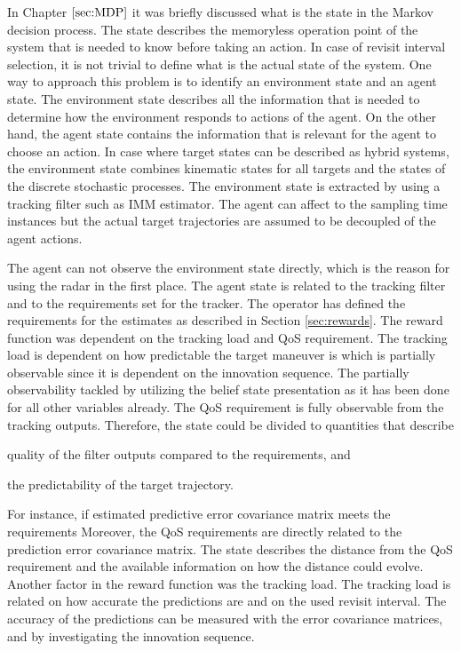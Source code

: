 \documentclass[english, 12pt, a4paper, elec, utf8, a-1b, online]{aaltothesis}
\begin{document}
In Chapter $\ref{sec:MDP}$ it was briefly discussed what is the state in the Markov decision process.
The state describes the memoryless operation point of the system that is needed to know before taking an action.
In case of revisit interval selection, it is not trivial to define what is the actual state of the system.
One way to approach this problem is to identify an environment state and an agent state.
The environment state describes all the information that is needed to determine how the environment responds to actions of the agent.
On the other hand, the agent state contains the information that is relevant for the agent to choose an action.
In case where target states can be described as hybrid systems, the environment state combines kinematic states for all targets and the states of the discrete stochastic processes.
The environment state is extracted by using a tracking filter such as IMM estimator.
The agent can affect to the sampling time instances but the actual target trajectories are assumed to be decoupled of the agent actions.

The agent can not observe the environment state directly, which is the reason for using the radar in the first place.
The agent state is related to the tracking filter and to the requirements set for the tracker.
The operator has defined the requirements for the estimates as described in Section \ref{sec:rewards}.
The reward function was dependent on the tracking load and QoS requirement.
The tracking load is dependent on how predictable the target maneuver is which is partially observable since it is dependent on the innovation sequence.
The partially observability tackled by utilizing the belief state presentation as it has been done for all other variables already.
The QoS requirement is fully observable from the tracking outputs.
Therefore, the state could be divided to quantities that describe 
\begin{enumerate*}
    \item quality of the filter outputs compared to the requirements, and
    \item the predictability of the target trajectory.  
\end{enumerate*}
For instance, if estimated predictive error covariance matrix meets the requirements 
Moreover, the QoS requirements are directly related to the prediction error covariance matrix.
The state describes the distance from the QoS requirement and the available information on how the distance could evolve. 
Another factor in the reward function was the tracking load.
The tracking load is related on how accurate the predictions are and on the used revisit interval.
The accuracy of the predictions can be measured with the error covariance matrices, and by investigating the innovation sequence.
\end{document}
